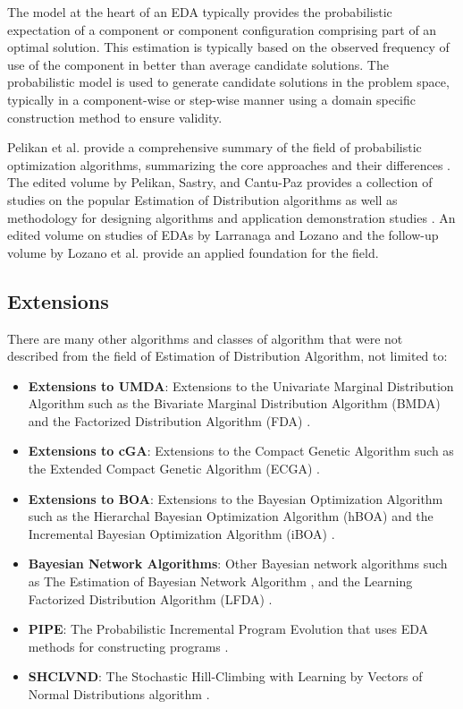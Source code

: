 \begin{bibunit}
The model at the heart of an EDA typically provides the probabilistic expectation of a component or component configuration comprising part of an optimal solution. This estimation is typically based on the observed frequency of use of the component in better than average candidate solutions. The probabilistic model is used to generate candidate solutions in the problem space, typically in a component-wise or step-wise manner using a domain specific construction method to ensure validity.

Pelikan et al. provide a comprehensive summary of the field of probabilistic optimization algorithms, summarizing the core approaches and their differences \cite{Pelikan2002b}.
The edited volume by Pelikan, Sastry, and Cantu-Paz provides a collection of studies on the popular Estimation of Distribution algorithms as well as methodology for designing algorithms and application demonstration studies \cite{Pelikan2006}.
An edited volume on studies of EDAs by Larranaga and Lozano \cite{Larranaga2002} and the follow-up volume by Lozano et al. \cite{Lozano2006} provide an applied foundation for the field.

%
%
\subsection{Extensions}
There are many other algorithms and classes of algorithm that were not described from the field of Estimation of Distribution Algorithm, not limited to:

\begin{itemize}
	\item \textbf{Extensions to UMDA}: Extensions to the Univariate Marginal Distribution Algorithm such as the Bivariate Marginal Distribution Algorithm (BMDA) \cite{Pelikan1998, Pelikan1999} and the Factorized Distribution Algorithm (FDA) \cite{Muhlenbein1999}.
	\item \textbf{Extensions to cGA}: Extensions to the Compact Genetic Algorithm such as the Extended Compact Genetic Algorithm (ECGA) \cite{Harik1999a, Harik2006}.
	\item \textbf{Extensions to BOA}: Extensions to the Bayesian Optimization Algorithm such as the Hierarchal Bayesian Optimization Algorithm (hBOA) \cite{Pelikan2000, Pelikan2001b} and the Incremental Bayesian Optimization Algorithm (iBOA) \cite{Pelikan2008}.
	\item \textbf{Bayesian Network Algorithms}: Other Bayesian network algorithms such as The Estimation of Bayesian Network Algorithm \cite{Etxeberria1999}, and the Learning Factorized Distribution Algorithm (LFDA) \cite{Muehlenbein1999}.
	\item \textbf{PIPE}: The Probabilistic Incremental Program Evolution that uses EDA methods for constructing programs \cite{Salustowicz1997}.
	\item \textbf{SHCLVND}: The Stochastic Hill-Climbing with Learning by Vectors of Normal Distributions algorithm \cite{Rudlof1996}.
\end{itemize}

\putbib
\end{bibunit}

